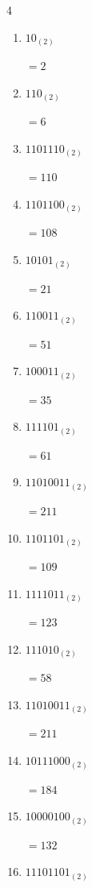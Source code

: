 \begin{multicols}{4}
\begin{enumerate}
        $=60$

  \item $10_{(2)}$

        $=2$

  \item $110_{(2)}$

        $=6$

  \item $1101110_{(2)}$

        $=110$

  \item $1101100_{(2)}$

        $=108$

\columnbreak %

  \item $10101_{(2)}$

        $=21$

  \item $110011_{(2)}$

        $=51$

  \item $100011_{(2)}$

        $=35$

  \item $111101_{(2)}$

        $=61$

  \item $11010011_{(2)}$

        $=211$

  \item $1101101_{(2)}$

        $=109$

  \item $1111011_{(2)}$

        $=123$

  \item $111010_{(2)}$

        $=58$

  \item $11010011_{(2)}$

        $=211$

  \item $10111000_{(2)}$

        $=184$

  \item $10000100_{(2)}$

        $=132$

  \item $11101101_{(2)}$


\end{enumerate}
\end{multicols}

